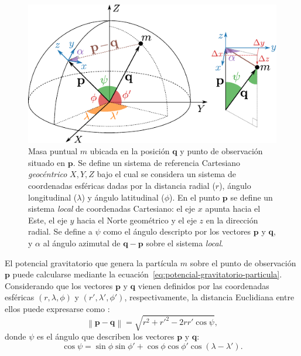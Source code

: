 \begin{figure}[t]
    \centering
    \includegraphics[width=\linewidth]{figs/spherical-coordinates.pdf}
    \caption{
        Masa puntual $m$ ubicada en la posición $\mathbf{q}$ y punto de
        observación situado en $\mathbf{p}$.
        Se define un sistema de referencia Cartesiano \emph{geocéntrico} $X, Y,
        Z$ bajo el cual se considera un sistema de coordenadas esféricas dadas
        por la distancia radial ($r$), ángulo longitudinal ($\lambda$) y ángulo
        latitudinal ($\phi$).
        En el punto $\mathbf{p}$ se define un sistema \emph{local} de
        coordenadas Cartesiano: el eje $x$ apunta hacia el Este,
        el eje $y$ hacia el Norte geométrico y el eje $z$ en la dirección
        radial.
        Se define a $\psi$ como el ángulo descripto por los vectores
        $\mathbf{p}$ y $\mathbf{q}$, y $\alpha$ al ángulo azimutal de
        $\mathbf{q} - \mathbf{p}$ sobre el sistema \emph{local}.
    }
    \label{fig:spherical-coordinates}
\end{figure}

El potencial gravitatorio que genera la partícula $m$ sobre el punto de
observación $\mathbf{p}$ puede calcularse mediante la
ecuación~\ref{eq:potencial-gravitatorio-particula}.
Considerando que los vectores $\mathbf{p}$ y $\mathbf{q}$ vienen definidos por
las coordenadas esféricas $(r, \lambda, \phi)$ y $(r', \lambda', \phi')$,
respectivamente, la distancia Euclidiana entre ellos puede expresarse como
\citep{grombein2013}:
%
\begin{equation}
    \left\lVert \mathbf{p} - \mathbf{q} \right\rVert = \sqrt{
        r^2 + r'^2 - 2rr'\cos\psi
    },
    \label{eq:distance-spherical}
\end{equation}
%
donde $\psi$ es el ángulo que describen los vectores $\mathbf{p}$
y $\mathbf{q}$:
%
\begin{equation}
    \cos \psi =
        \sin \phi \sin \phi' + \cos \phi \cos \phi' \cos(\lambda - \lambda').
    \label{eq:cosphi}
\end{equation}

